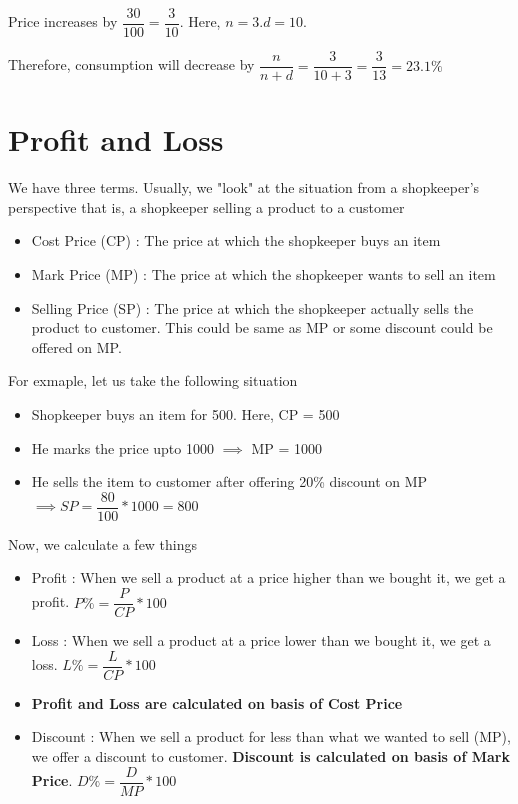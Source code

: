 
Price increases by $\dfrac{30}{100} = \dfrac{3}{10}$. Here, $n = 3. d = 10$. 

Therefore, consumption will decrease by $\dfrac{n}{n + d} = \dfrac{3}{10 + 3} = \dfrac{3}{13} = 23.1\% $

\newpage

\section{Profit and Loss}
We have three terms. Usually, we "look" at the situation from a shopkeeper's perspective that is, a shopkeeper selling a product to a customer

\begin{itemize}
    \item Cost Price (CP) : The price at which the shopkeeper buys an item
    \item Mark Price (MP) : The price at which the shopkeeper wants to sell an item
    \item Selling Price (SP) : The price at which the shopkeeper actually sells the product to customer. This could be same as MP or some discount could be offered on MP.
\end{itemize}

For exmaple, let us take the following situation
\begin{itemize}
    \item Shopkeeper buys an item for 500. Here, CP = 500
    \item He marks the price upto 1000 $\implies$ MP = 1000
    \item He sells the item to customer after offering 20\% discount on MP $\implies SP = \dfrac{80}{100} * 1000 = 800$
\end{itemize}

Now, we calculate a few things
\begin{itemize}
    \item Profit : When we sell a product at a price higher than we bought it, we get a profit. $P\% = \dfrac{P}{CP} * 100$
    \item Loss : When we sell a product at a price lower than we bought it, we get a loss. $L\% = \dfrac{L}{CP} * 100$
    \item \textbf{Profit and Loss are calculated on basis of Cost Price}
    \item Discount : When we sell a product for less than what we wanted to sell (MP), we offer a discount to customer. \textbf{Discount is calculated on basis of Mark  Price}. $D\% = \dfrac{D}{MP} * 100$
\end{itemize}

